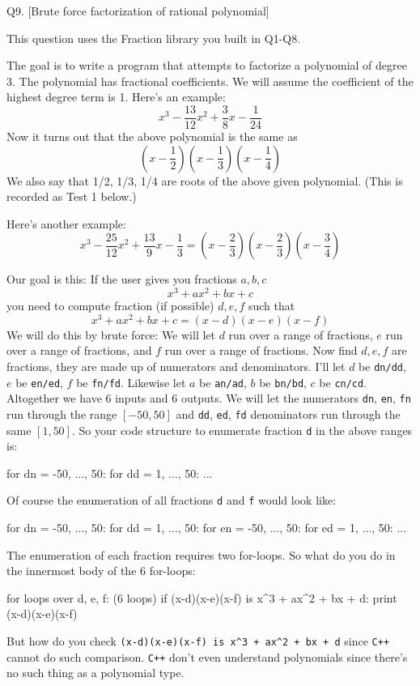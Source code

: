 Q9. [Brute force factorization of rational polynomial]

This question uses the Fraction library you built in Q1-Q8.

The goal is to write a program that attempts to factorize a polynomial of degree
3. The polynomial has fractional coefficients.
We will assume the coefficient of the highest degree term is 1.
Here's an example:
\[
  x^3 - \frac{13}{12} x^2 + \frac{3}{8}x - \frac{1}{24}
\]
Now it turns out that the above polynomial is the same as
\[
  \left( x - \frac{1}{2} \right)
  \left( x - \frac{1}{3} \right)
  \left( x - \frac{1}{4} \right)
\]
We also say that 1/2, 1/3, 1/4 are roots of the above given polynomial.
(This is recorded as Test 1 below.)

Here's another example:
\[
  x^3 - \frac{25}{12}x^2 + \frac{13}{9}x - \frac{1}{3} =
  \left( x - \frac{2}{3} \right)
  \left( x - \frac{2}{3} \right)
  \left( x - \frac{3}{4} \right)  
\]

Our goal is this: If the user gives you fractions $a,b,c$
\[
  x^3 + ax^2 + bx + c
\]
you need to compute fraction (if possible) $d,e,f$ such that
\[
  x^3 + ax^2 + bx + c = (x - d)(x - e)(x - f)
\]
We will do this by brute force:
We will let $d$ run over a range of fractions, $e$ run over a range of fractions,
and $f$ run over a range of fractions.
Now find $d,e,f$ are fractions, they are made up of numerators and denominators.
I'll let
$d$ be \verb!dn/dd!,
$e$ be \verb!en/ed!,
$f$ be \verb!fn/fd!.
Likewise let 
$a$ be \verb!an/ad!,
$b$ be \verb!bn/bd!,
$c$ be \verb!cn/cd!.
Altogether we have 6 inputs and 6 outputs.
We will let the numerators
\verb!dn!,
\verb!en!,
\verb!fn!
run through the range $[-50, 50]$ and
\verb!dd!,
\verb!ed!,
\verb!fd!
denominators run through the same $[1, 50]$.
So your code structure to enumerate fraction \verb!d! in the above ranges is:
\begin{console}
for dn = -50, ..., 50:
    for dd = 1, ..., 50:
        ... 
\end{console}
Of course the enumeration of all fractions \verb!d! and \verb!f! would look like:      
\begin{console}
for dn = -50, ..., 50:
    for dd = 1, ..., 50:
        for en = -50, ..., 50:
            for ed = 1, ..., 50:
                ... 
\end{console}
The enumeration of each fraction requires two for-loops.
So what do you do in the innermost body of the 6 for-loops:
\begin{console}
for loops over d, e, f: (6 loops)
         if (x-d)(x-e)(x-f) is x^3 + ax^2 + bx + d:
             print (x-d)(x-e)(x-f)
\end{console}
But how do you check
\verb!(x-d)(x-e)(x-f) is x^3 + ax^2 + bx + d! since \texttt{C++}
cannot do such comparison.
\texttt{C++}
don't even understand polynomials since there's no such thing as a polynomial type.

